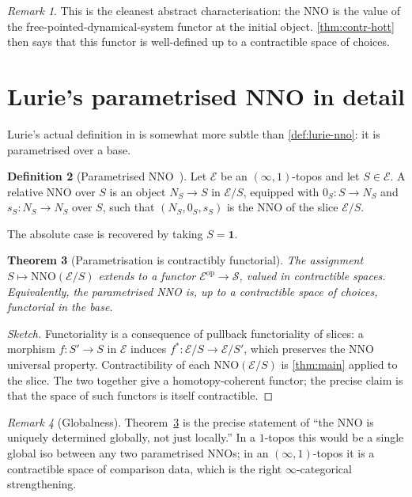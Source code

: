 \documentclass[12pt]{article}
\newtheorem{theorem}{Theorem}[section]
\theoremstyle{definition}
\newtheorem{definition}[theorem]{Definition}
\theoremstyle{remark}
\newtheorem{remark}[theorem]{Remark}
\newcommand{\op}{\mathrm{op}}
\newcommand{\Spc}{\mathcal{S}}
\begin{document}
\begin{remark}
This is the cleanest abstract characterisation: the NNO is the value of the free-pointed-dynamical-system functor at the initial object. \cref{thm:contr-hott} then says that this functor is well-defined up to a contractible space of choices.
\end{remark}

\section{Lurie's parametrised NNO in detail}\label{sec:lurie-param}

Lurie's actual definition in \cite[\S6]{LurieHTT} is somewhat more subtle than \cref{def:lurie-nno}: it is parametrised over a base.

\begin{definition}[Parametrised NNO~\cite{LurieHTT}]\label{def:param-nno}
Let $\mathcal{E}$ be an $(\infty,1)$-topos and let $S\in\mathcal{E}$. A relative NNO over $S$ is an object $N_{S}\to S$ in $\mathcal{E}/S$, equipped with $0_{S}\colon S\to N_{S}$ and $s_{S}\colon N_{S}\to N_{S}$ over $S$, such that $(N_{S},0_{S},s_{S})$ is the NNO of the slice $\mathcal{E}/S$.
\end{definition}

The absolute case is recovered by taking $S=\mathbf{1}$.

\begin{theorem}[Parametrisation is contractibly functorial]\label{thm:param-functorial}
The assignment $S\mapsto \mathrm{NNO}(\mathcal{E}/S)$ extends to a functor $\mathcal{E}^{\op}\to \Spc$, valued in contractible spaces. Equivalently, the parametrised NNO is, up to a contractible space of choices, functorial in the base.
\end{theorem}

\begin{proof}[Sketch]
Functoriality is a consequence of pullback functoriality of slices: a morphism $f\colon S'\to S$ in $\mathcal{E}$ induces $f^{*}\colon \mathcal{E}/S\to \mathcal{E}/S'$, which preserves the NNO universal property. Contractibility of each $\mathrm{NNO}(\mathcal{E}/S)$ is \cref{thm:main} applied to the slice. The two together give a homotopy-coherent functor; the precise claim is that the space of such functors is itself contractible.
\end{proof}

\begin{remark}[Globalness]
Theorem~\ref{thm:param-functorial} is the precise statement of ``the NNO is uniquely determined globally, not just locally.'' In a $1$-topos this would be a single global iso between any two parametrised NNOs; in an $(\infty,1)$-topos it is a contractible space of comparison data, which is the right $\infty$-categorical strengthening.
\end{remark}
\end{document}
